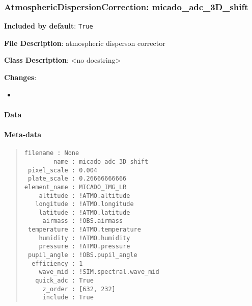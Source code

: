 \subsubsection{AtmosphericDispersionCorrection: \textquotedbl{}micado\_adc\_3D\_shift\textquotedbl{}%
  \label{atmosphericdispersioncorrection-micado-adc-3d-shift}%
}

\textbf{Included by default}: \texttt{True}

\textbf{File Description}: atmospheric disperson corrector

\textbf{Class Description}: <no docstring>

\textbf{Changes}:

\begin{itemize}
\item \end{itemize}


\paragraph{Data%
  \label{id1}%
}


\paragraph{Meta-data%
  \label{id2}%
}

\begin{quote}
\begin{alltt}
\begin{lstlisting}[frame=single]
    filename : None
        name : micado_adc_3D_shift
 pixel_scale : 0.004
 plate_scale : 0.26666666666
element_name : MICADO_IMG_LR
    altitude : !ATMO.altitude
   longitude : !ATMO.longitude
    latitude : !ATMO.latitude
     airmass : !OBS.airmass
 temperature : !ATMO.temperature
    humidity : !ATMO.humidity
    pressure : !ATMO.pressure
 pupil_angle : !OBS.pupil_angle
  efficiency : 1
    wave_mid : !SIM.spectral.wave_mid
   quick_adc : True
     z_order : [632, 232]
     include : True
\end{lstlisting}
\end{alltt}
\end{quote}

